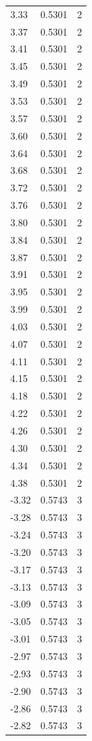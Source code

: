 \begin{longtable}{lrr}
  3.33 & 0.5301 & 2 \\
  3.37 & 0.5301 & 2 \\
  3.41 & 0.5301 & 2 \\
  3.45 & 0.5301 & 2 \\
  3.49 & 0.5301 & 2 \\
  3.53 & 0.5301 & 2 \\
  3.57 & 0.5301 & 2 \\
  3.60 & 0.5301 & 2 \\
  3.64 & 0.5301 & 2 \\
  3.68 & 0.5301 & 2 \\
  3.72 & 0.5301 & 2 \\
  3.76 & 0.5301 & 2 \\
  3.80 & 0.5301 & 2 \\
  3.84 & 0.5301 & 2 \\
  3.87 & 0.5301 & 2 \\
  3.91 & 0.5301 & 2 \\
  3.95 & 0.5301 & 2 \\
  3.99 & 0.5301 & 2 \\
  4.03 & 0.5301 & 2 \\
  4.07 & 0.5301 & 2 \\
  4.11 & 0.5301 & 2 \\
  4.15 & 0.5301 & 2 \\
  4.18 & 0.5301 & 2 \\
  4.22 & 0.5301 & 2 \\
  4.26 & 0.5301 & 2 \\
  4.30 & 0.5301 & 2 \\
  4.34 & 0.5301 & 2 \\
  4.38 & 0.5301 & 2 \\
  -3.32 & 0.5743 & 3 \\
  -3.28 & 0.5743 & 3 \\
  -3.24 & 0.5743 & 3 \\
  -3.20 & 0.5743 & 3 \\
  -3.17 & 0.5743 & 3 \\
  -3.13 & 0.5743 & 3 \\
  -3.09 & 0.5743 & 3 \\
  -3.05 & 0.5743 & 3 \\
  -3.01 & 0.5743 & 3 \\
  -2.97 & 0.5743 & 3 \\
  -2.93 & 0.5743 & 3 \\
  -2.90 & 0.5743 & 3 \\
  -2.86 & 0.5743 & 3 \\
  -2.82 & 0.5743 & 3 \\

\end{longtable}
